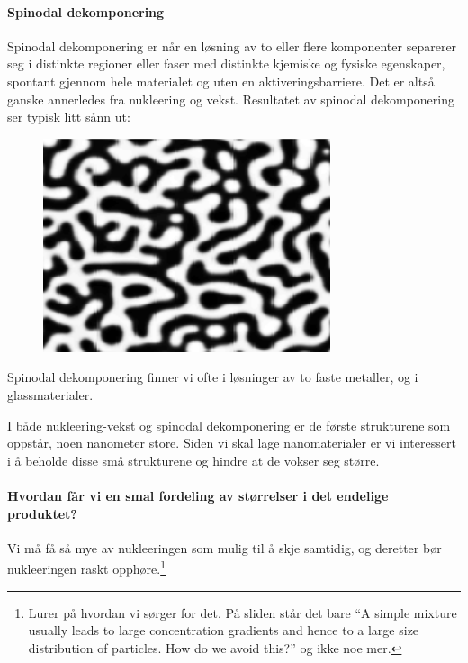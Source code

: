 \paragraph{Spinodal dekomponering}
\label{sec:spinodal_decomposition}
Spinodal dekomponering er når en løsning av to eller flere komponenter separerer seg i distinkte regioner eller faser med distinkte kjemiske og fysiske egenskaper, spontant gjennom hele materialet og uten en aktiveringsbarriere. Det er altså ganske annerledes fra nukleering og vekst. Resultatet av spinodal dekomponering ser typisk litt sånn ut:
\begin{figure}[H]
	\centering
	\includegraphics[width=\linewidth]{spino.png}
	\label{fig:spino}
\end{figure}
Spinodal dekomponering finner vi ofte i løsninger av to faste metaller, og i glassmaterialer.

I både nukleering-vekst og spinodal dekomponering er de første strukturene som oppstår, noen nanometer store. Siden vi skal lage nanomaterialer er vi interessert i å beholde disse små strukturene og hindre at de vokser seg større.

\paragraph{Hvordan får vi en smal fordeling av størrelser i det endelige produktet?} Vi må få så mye av nukleeringen som mulig til å skje samtidig, og deretter bør nukleeringen raskt opphøre.\footnote{Lurer på hvordan vi sørger for det. På sliden står det bare ``A simple mixture usually leads to large concentration
gradients and hence to a large size distribution of particles. How do we avoid this?'' og ikke noe mer.}


